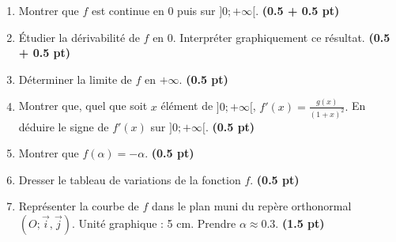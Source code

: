 \documentclass[12pt,a4paper]{article}
\begin{document}
\begin{enumerate}
    \item Montrer que $f$ est continue en $0$ puis sur $]0 ; +\infty[$. \hfill \textbf{(0.5 + 0.5 pt)}

    \item  Étudier la dérivabilité de $f$ en $0$. Interpréter graphiquement ce résultat. \hfill \textbf{(0.5 + 0.5 pt)}

    \item  Déterminer la limite de $f$ en $+\infty$. \hfill \textbf{(0.5 pt)}

    \item  Montrer que, quel que soit $x$ élément de $]0 ; +\infty[$, 
\(f'(x) = \frac{g(x)}{(1 + x)^2}.\)
En déduire le signe de $f'(x)$ sur $]0 ; +\infty[$. \hfill \textbf{(0.5 pt)}

    \item  Montrer que $f(\alpha) = -\alpha$. \hfill \textbf{(0.5 pt)}

    \item  Dresser le tableau de variations de la fonction $f$. \hfill \textbf{(0.5 pt)}

    \item  Représenter la courbe de $f$ dans le plan muni du repère orthonormal $(O ; \vec{i}, \Vec{j})$. Unité graphique : 5 cm. Prendre $\alpha \approx 0.3$. \hfill \textbf{(1.5 pt)}
\end{enumerate}
\end{document}
